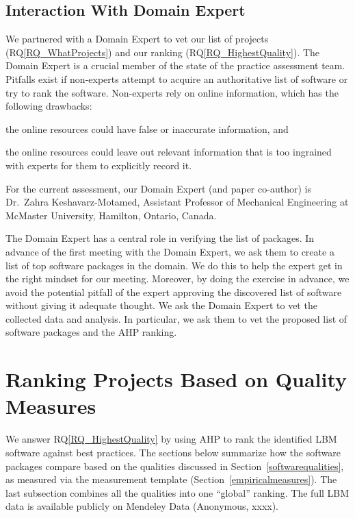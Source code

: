 \documentclass[final, 3p, times, authoryear]{elsarticle}
\newcommand{\rqref}[1]{RQ\ref{#1}}
\begin{document}
\subsection{Interaction With Domain Expert} \label{sec_vet_software_list}

We partnered with a Domain Expert to vet our list of projects
(\rqref{RQ_WhatProjects}) and our ranking (\rqref{RQ_HighestQuality}). The
Domain Expert is a crucial member of the state of the practice assessment team.
Pitfalls exist if non-experts attempt to acquire an authoritative list of
software or try to rank the software. Non-experts rely on online information,
which has the following drawbacks:
\begin{inparaenum}[i)]
  \item the online resources could have false or inaccurate information, and 
  \item the online resources could leave out relevant information that is too
  ingrained with experts for them to explicitly record it.
\end{inparaenum}
For the current assessment, our Domain Expert (and paper co-author) is Dr.\
 Zahra Keshavarz-Motamed, Assistant Professor of Mechanical Engineering at
McMaster University, Hamilton, Ontario, Canada.  

The Domain Expert has a central role in verifying the list of packages. In
advance of the first meeting with the Domain Expert, we ask them to create a
list of top software packages in the domain.  We do this to help the expert get
in the right mindset for our meeting.  Moreover, by doing the exercise in
advance, we avoid the potential pitfall of the expert approving the discovered
list of software without giving it adequate thought. We ask the Domain Expert to
vet the collected data and analysis. In particular, we ask them to vet the
proposed list of software packages and the AHP ranking.

\section{Ranking Projects Based on Quality Measures} \label{AHPresults}

We answer \rqref{RQ_HighestQuality} by using AHP to rank the identified LBM
software against best practices.  The sections below summarize how the software
packages compare based on the qualities discussed in
Section~\ref{softwarequalities}, as measured via the measurement template
(Section~\ref{empiricalmeasures}).  The last subsection combines all the
qualities into one ``global'' ranking.  The full LBM data is available publicly
on Mendeley Data (Anonymous, xxxx)\footnotemark[1]. %
\end{document}

